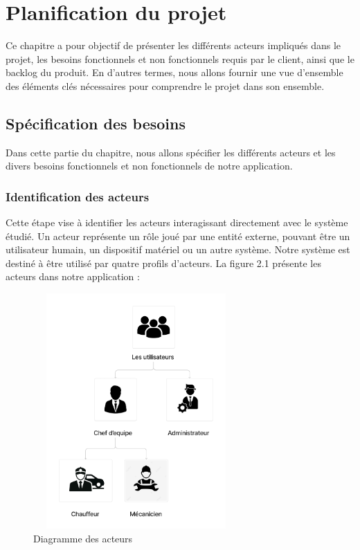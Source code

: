 
\chapter{ Planification du projet}



Ce chapitre a pour objectif de présenter les différents acteurs impliqués dans le projet, les besoins fonctionnels et non fonctionnels  requis par le client, ainsi que le backlog du produit. En d'autres termes, nous allons fournir une vue d'ensemble des éléments clés nécessaires pour comprendre le projet dans son ensemble.
\section{Spécification des besoins}
Dans cette partie du chapitre, nous allons spécifier les différents acteurs et les divers besoins fonctionnels et non fonctionnels de notre application.
    \subsection{Identification des acteurs}
    Cette étape vise à identifier les acteurs interagissant directement avec le système étudié. Un acteur représente un rôle joué par une entité externe, pouvant être un utilisateur humain, un dispositif matériel ou un autre système. Notre système est destiné à être utilisé par quatre profils d'acteurs. La figure 2.1 présente les acteurs dans notre application : 

    \begin{figure}[h!]
      \centering
      \includegraphics[width=0.7\textwidth,height=9cm]{chap2.images/Diagramme des acteurs.png}
      \caption{Diagramme des acteurs}
    \end{figure}

